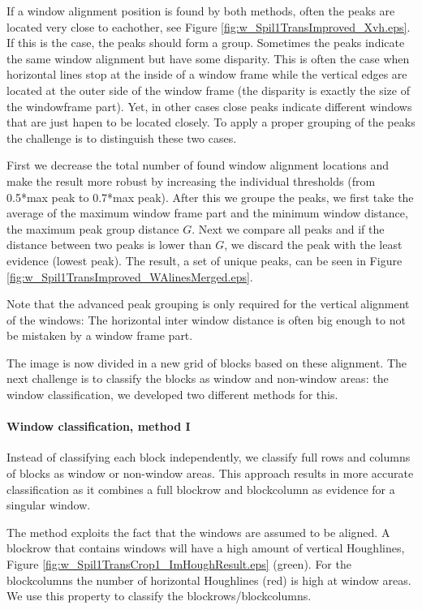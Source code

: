 If a window alignment position is found by both methods, often the peaks are
located very close to eachother, see Figure
\ref{fig:w_Spil1TransImproved_Xvh.eps}.  If this is the case, the peaks should
form a group.  Sometimes the peaks indicate the same window alignment but have
some disparity.  This is often the case when horizontal lines stop at the inside
of a window frame while the vertical edges are located at the outer side of the
window frame (the disparity is exactly the size of the windowframe part).  Yet,
in other cases close peaks indicate different windows that are just hapen to be
located closely.  To apply a proper grouping of the peaks the challenge is to
distinguish these two cases.

First we decrease the total number of found window alignment locations and make 
the result more robust by increasing the individual thresholds (from 0.5*max
peak to 0.7*max peak). 
After this we groupe the peaks, we first take the average of the maximum window frame part and the minimum window
distance, the maximum peak group distance $G$.
Next we compare all peaks and if the distance between two peaks is lower than
$G$, we discard the peak with the least evidence (lowest peak). The result,
a set of unique peaks, can be seen in Figure \ref{fig:w_Spil1TransImproved_WAlinesMerged.eps}.

Note that the advanced peak grouping is only required for the vertical alignment
of the windows: The horizontal inter window distance is often big enough to not
be mistaken by a window frame part.

The image is now divided in a new grid of blocks based on these
alignment. The next challenge is to classify the blocks as window and
non-window areas: the window classification, we developed two different methods for this.


\paragraph{Window classification, method I}
Instead of classifying each block independently, we classify full rows and
columns of blocks as window or non-window areas.  This approach results in more accurate
classification as it combines a full blockrow and blockcolumn as evidence for a singular
window. 

The method exploits the fact that the windows are assumed to be
aligned.
A blockrow that contains windows will have a high amount of vertical
Houghlines, Figure \ref{fig:w_Spil1TransCrop1_ImHoughResult.eps}
(green). For the blockcolumns the number of horizontal Houghlines
 (red) is high at window areas.  We use this property to classify 
 the blockrows/blockcolumns. 


